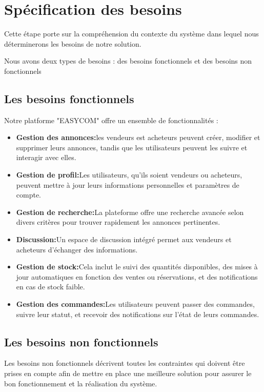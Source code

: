 \documentclass[edit,12pt,a4paper,ChapStyle,oneside,doubleinterligne]{report}
\begin{document}
\section{Spécification des besoins}
Cette étape porte sur la compréhension du contexte du système dans lequel nous déterminerons les besoins de notre solution.

Nous avons deux types de besoins : des besoins fonctionnels et des besoins non fonctionnels
\subsection{Les besoins fonctionnels }
Notre platforme "EASYCOM" offre un ensemble de fonctionnalités :
\begin{itemize}
    \item \textbf{Gestion des annonces:}les vendeurs est acheteurs peuvent créer, modifier et supprimer leurs annonces, tandis que les utilisateurs peuvent les suivre et interagir avec elles.
    \item \textbf{Gestion de profil:}Les utilisateurs, qu'ils soient vendeurs ou acheteurs, peuvent mettre à jour leurs informations personnelles et paramètres de compte.
    \item \textbf{Gestion de recherche:}La plateforme offre une recherche avancée selon divers critères pour trouver rapidement les annonces pertinentes.
    \item \textbf{Discussion:}Un espace de discussion intégré permet aux vendeurs et acheteurs d'échanger des informations.
    \item \textbf{Gestion de stock:}Cela inclut le suivi des quantités disponibles, des mises à jour automatiques en fonction des ventes ou réservations, et des notifications en cas de stock faible. 
    \item \textbf{Gestion des commandes:}Les utilisateurs peuvent passer des commandes, suivre leur statut, et recevoir des notifications sur l'état de leurs commandes.
\end{itemize}
\subsection{Les besoins non fonctionnels}
Les besoins non fonctionnels décrivent toutes les contraintes qui doivent être prises en compte afin de mettre en place une meilleure solution pour assurer le bon fonctionnement et la réalisation du système.
\end{document}
